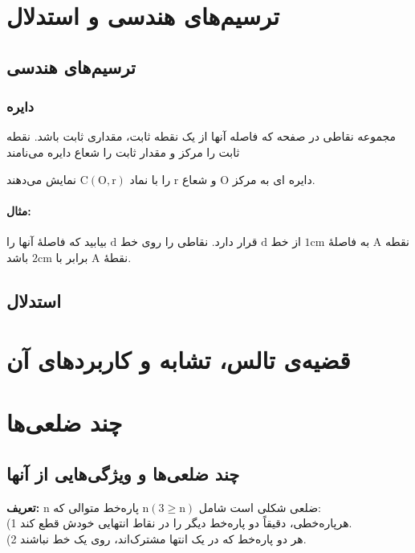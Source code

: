 \documentclass[12pt, a4paper]{book}
\begin{document}
\chapter{ترسیم‌های هندسی و استدلال}

\section{ترسیم‌های هندسی}

\subsection{دایره}
مجموعه نقاطی در صفحه که فاصله آنها از یک نقطه ثابت، مقداری ثابت باشد. نقطه ثابت را مرکز و مقدار ثابت را شعاع دایره می‌نامند

دایره ای به مرکز
 $\mathrm{O}$
  و شعاع
   $\mathrm{r}$
    را با نماد
 $\mathrm{C}(\mathrm{O},\mathrm{r})$
  نمایش می‌دهند.

\subsubsection*{مثال:}
نقطه 
$\mathrm{A}$
به فاصلۀ
$\mathrm{1cm}$
از خط 
$\mathrm{d}$
قرار دارد. نقاطی را روی خط
$\mathrm{d}$
بیابید که فاصلۀ آنها را نقطۀ
$\mathrm{A}$
برابر با
$\mathrm{2cm}$
باشد.

\section{استدلال}

\chapter{قضیه‌ی تالس، تشابه و کاربردهای آن}


\chapter{چند ضلعی‌ها}

\section{چند ضلعی‌ها و ویژگی‌هایی از آنها}

\textbf{تعریف:}
n
ضلعی شکلی است شامل 
$\text{n}(3 \geq \text{n})$
پاره‌خط متوالی که:\\
(1 هرپاره‌خطی، دقیقاً دو پاره‌خط دیگر را در نقاط انتهایی خودش قطع کند.\\
(2 هر دو پاره‌خط که در یک انتها مشترک‌اند، روی یک خط نباشند.
\end{document}
